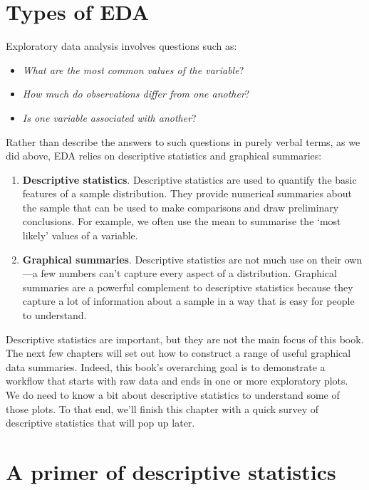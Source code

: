\documentclass[
]{book}
\providecommand{\tightlist}{%
  \setlength{\itemsep}{0pt}\setlength{\parskip}{0pt}}
\begin{document}
\hypertarget{types-of-eda}{%
\section{Types of EDA}\label{types-of-eda}}

Exploratory data analysis involves questions such as:

\begin{itemize}
\tightlist
\item
  \emph{What are the most common values of the variable}?
\item
  \emph{How much do observations differ from one another}?
\item
  \emph{Is one variable associated with another}?
\end{itemize}

Rather than describe the answers to such questions in purely verbal terms, as we did above, EDA relies on descriptive statistics and graphical summaries:

\begin{enumerate}
\def\labelenumi{\arabic{enumi}.}
\item
  \textbf{Descriptive statistics}. Descriptive statistics are used to quantify the basic features of a sample distribution. They provide numerical summaries about the sample that can be used to make comparisons and draw preliminary conclusions. For example, we often use the mean to summarise the `most likely' values of a variable.
\item
  \textbf{Graphical summaries}. Descriptive statistics are not much use on their own---a few numbers can't capture every aspect of a distribution. Graphical summaries are a powerful complement to descriptive statistics because they capture a lot of information about a sample in a way that is easy for people to understand.
\end{enumerate}

Descriptive statistics are important, but they are not the main focus of this book. The next few chapters will set out how to construct a range of useful graphical data summaries. Indeed, this book's overarching goal is to demonstrate a workflow that starts with raw data and ends in one or more exploratory plots. We do need to know a bit about descriptive statistics to understand some of those plots. To that end, we'll finish this chapter with a quick survey of descriptive statistics that will pop up later.

\hypertarget{a-primer-of-descriptive-statistics}{%
\section{A primer of descriptive statistics}\label{a-primer-of-descriptive-statistics}}
\end{document}
